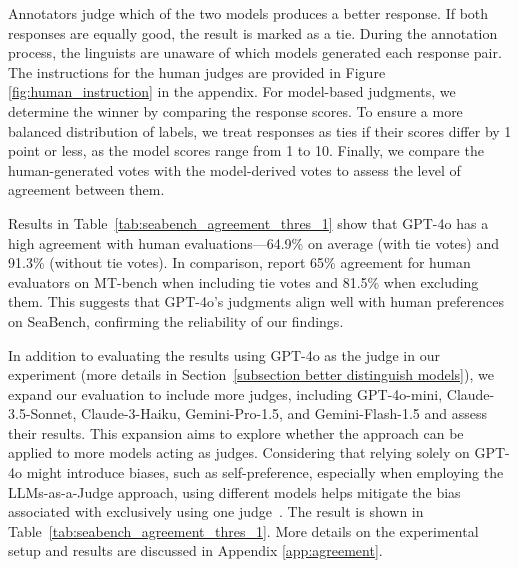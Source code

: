 Annotators judge which of the two models produces a better response. If both responses are equally good, the result is marked as a tie. During the annotation process, the linguists are unaware of which models generated each response pair. The instructions for the human judges are provided in Figure \ref{fig:human_instruction} in the appendix. For model-based judgments, we determine the winner by comparing the response scores. To ensure a more balanced distribution of labels, we treat responses as ties if their scores differ by 1 point or less, as the model scores range from 1 to 10. Finally, we compare the human-generated votes with the model-derived votes to assess the level of agreement between them.


Results in Table~\ref{tab:seabench_agreement_thres_1} show that GPT-4o has a high agreement with human evaluations—64.9\% on average (with tie votes) and 91.3\% (without tie votes). In comparison, \citet{zheng_judging_2023} report 65\% agreement for human evaluators on MT-bench when including tie votes and 81.5\% when excluding them. This suggests that GPT-4o’s judgments align well with human preferences on SeaBench, confirming the reliability of our findings.


In addition to evaluating the results using GPT-4o as the judge in our experiment (more details in Section~\ref{subsection better distinguish models}), we expand our evaluation to include more judges, including GPT-4o-mini, Claude-3.5-Sonnet, Claude-3-Haiku, Gemini-Pro-1.5, and Gemini-Flash-1.5 and assess their results. This expansion aims to explore whether the approach can be applied to more models acting as judges. Considering that relying solely on GPT-4o might introduce biases, such as self-preference, especially when employing the LLMs-as-a-Judge approach, using different models helps mitigate the bias associated with exclusively using one judge~\cite{bai2023benchmarkingfoundationmodelslanguagemodelasanexaminer, ying2024automatingdatasetupdatesreliable, zhao2024auto}.
The result is shown in Table~\ref{tab:seabench_agreement_thres_1}. More details on the experimental setup and results are discussed in Appendix \ref{app:agreement}. 
